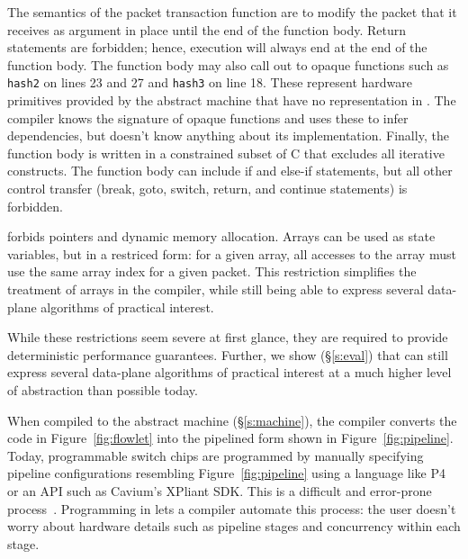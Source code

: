 The semantics of the packet transaction function are to modify the packet that
it receives as argument in place until the end of the function body. Return
statements are forbidden; hence, execution will always end at the end of
the function body. The function body may also call out to opaque functions such
as \texttt{hash2} on lines 23 and 27 and \texttt{hash3} on line 18. These
represent hardware primitives provided by the abstract machine that have no
representation in \pktlanguage. The \pktlanguage compiler knows the signature
of opaque functions and uses these to infer dependencies, but doesn't know
anything about its implementation. Finally, the function body is written in a
constrained subset of C that excludes all iterative constructs. The function
body can include if and else-if statements, but all other control transfer
(break, goto, switch, return, and continue statements) is forbidden.

\pktlanguage forbids pointers and dynamic memory allocation. Arrays can be used
as state variables, but in a restriced form: for a given array, all accesses to
the array must use the same array index for a given packet. This restriction
simplifies the treatment of arrays in the compiler, while still being able to
express several data-plane algorithms of practical interest.

While these restrictions seem severe at first glance, they are required to
provide deterministic performance guarantees. Further, we show (\S\ref{s:eval})
that \pktlanguage can still express several data-plane algorithms  of practical
interest at a much higher level of abstraction than possible today.

When compiled to the \absmachine abstract machine (\S\ref{s:machine}), the
\pktlanguage compiler converts the code in Figure~\ref{fig:flowlet} into the
pipelined form shown in Figure~\ref{fig:pipeline}. Today, programmable switch
chips are programmed by manually specifying pipeline configurations resembling
Figure~\ref{fig:pipeline} using a language like P4 or an API such as Cavium's
XPliant SDK. This is a difficult and error-prone process~\cite{p4-semantics}.
Programming in \pktlanguage lets a compiler automate this process:
the user doesn't worry about hardware details such as pipeline stages and
concurrency within each stage.
